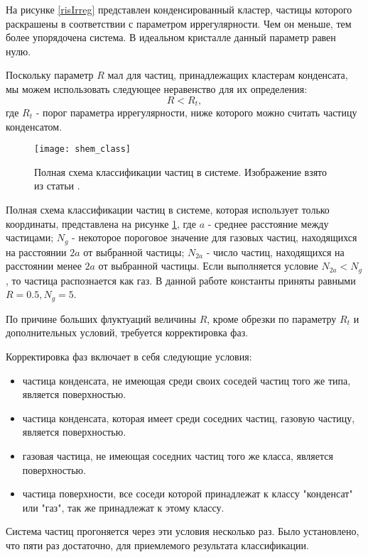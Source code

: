 На рисунке \ref{risIrreg} представлен конденсированный кластер, частицы которого раскрашены в соответствии с параметром иррегулярности. Чем он меньше, тем более упорядочена система. В идеальном кристалле данный параметр равен нулю.

Поскольку параметр $R$ мал для частиц, принадлежащих кластерам конденсата, мы можем использовать следующее неравенство для их определения:
\begin{equation}
R < R_t,
\end{equation}
где $R_t$ - порог параметра иррегулярности, ниже которого можно считать частицу конденсатом.

\begin{figure}[h]
\begin{center}
\texttt{[image: shem\_class]}
\caption{Полная схема классификации частиц в системе. Изображение взято из статьи \cite{Ovcharov2017}.}
\label{risShemClass}
\end{center}
\end{figure}

Полная схема классификации частиц в системе, которая использует только координаты, представлена на рисунке \ref{risShemClass},
где $a$ - среднее расстояние между частицами; $N_g$ - некоторое пороговое значение для газовых частиц, находящихся на расстоянии $2a$ от выбранной частицы; $N_{2a}$ - число частиц, находящихся на расстоянии менее $2a$ от выбранной частицы. Если выполняется условие $N_{2a} < N_{g}$, то частица распознается как газ.
В данной работе константы приняты равными $R = 0.5, N_g = 5$.

По причине больших флуктуаций величины $R$, кроме обрезки по параметру $R_t$ и дополнительных условий, требуется корректировка фаз.

Корректировка фаз включает в себя следующие условия:
\begin{itemize}
\item частица конденсата, не имеющая среди своих соседей частиц того же типа, является поверхностью.
\item частица конденсата, которая имеет среди соседних частиц, газовую частицу, является поверхностью.
\item газовая частица, не имеющая соседних частиц того же класса,  является поверхностью.
\item частица поверхности, все соседи которой принадлежат к классу "конденсат" или "газ", так же принадлежат к этому классу.
\end{itemize}
Система частиц прогоняется через эти условия несколько раз. Было установлено, что пяти раз достаточно, для приемлемого результата классификации.

